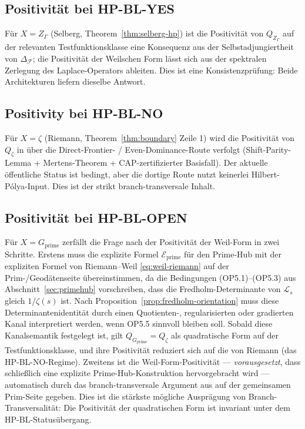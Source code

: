 \documentclass[11pt]{article}
\theoremstyle{definition}
\theoremstyle{remark}
\newcommand{\HBL}{\mathrm{HP\text{-}BL}}
\begin{document}
\subsection{Positivität bei HP-BL-YES}

Für $X = Z_\Gamma$ (Selberg, Theorem~\ref{thm:selberg-hp}) ist die
Positivität von $Q_{Z_\Gamma}$ auf der relevanten Testfunktionsklasse eine
Konsequenz aus der Selbstadjungiertheit von $\Delta_\mathcal{F}$; die Positivität
der Weilschen Form lässt sich aus der spektralen Zerlegung
des Laplace-Operators ableiten. Dies ist eine Konsistenzprüfung: Beide Architekturen
liefern dieselbe Antwort.

\subsection{Positivity bei HP-BL-NO}

Für $X = \zeta$ (Riemann, Theorem~\ref{thm:boundary} Zeile 1) wird die
Positivität von $Q_\zeta$ in \cite{Geiger2026RHII}
über die Direct-Frontier- / Even-Dominance-Route verfolgt
(Shift-Parity-Lemma + Mertens-Theorem + CAP-zertifizierter Basisfall).
Der aktuelle öffentliche Status ist bedingt, aber die dortige Route
nutzt keinerlei Hilbert-P\'olya-Input. Dies ist der strikt
branch-transversale Inhalt.

\subsection{Positivität bei HP-BL-OPEN}

Für $X = G_\mathrm{prime}$ zerfällt die Frage nach der Positivität der Weil-Form
in zwei Schritte. Erstens muss die explizite Formel $\mathcal{E}_\mathrm{prime}$
für den Prime-Hub mit der expliziten Formel von Riemann--Weil
\eqref{eq:weil-riemann} auf der Prim-/Geodätenseite übereinstimmen, da
die Bedingungen (OP5.1)--(OP5.3) aus Abschnitt~\ref{sec:primehub}
vorschreiben, dass die Fredholm-Determinante von $\mathcal{L}_s$ gleich $1/\zeta(s)$ ist.
Nach Proposition~\ref{prop:fredholm-orientation} muss diese
Determinantenidentität durch einen Quotienten-, regularisierten oder
gradierten Kanal interpretiert werden, wenn OP5.5 sinnvoll bleiben
soll. Sobald diese Kanalsemantik festgelegt ist, gilt
$Q_{G_\mathrm{prime}} = Q_\zeta$ als quadratische Form auf der
Testfunktionsklasse, und ihre Positivität reduziert sich auf die von Riemann
(das HP-BL-NO-Regime). Zweitens ist die Weil-Form-Positivität --- \emph{vorausgesetzt}, dass schließlich eine explizite
Prime-Hub-Konstruktion hervorgebracht wird ---
automatisch durch das branch-transversale Argument aus
\cite{Geiger2026RHII} auf der gemeinsamen Prim-Seite gegeben. Dies ist die stärkste
mögliche Ausprägung von Branch-Transversalität: Die Positivität der
quadratischen Form ist invariant unter dem $\HBL$-Statusübergang.
\end{document}
